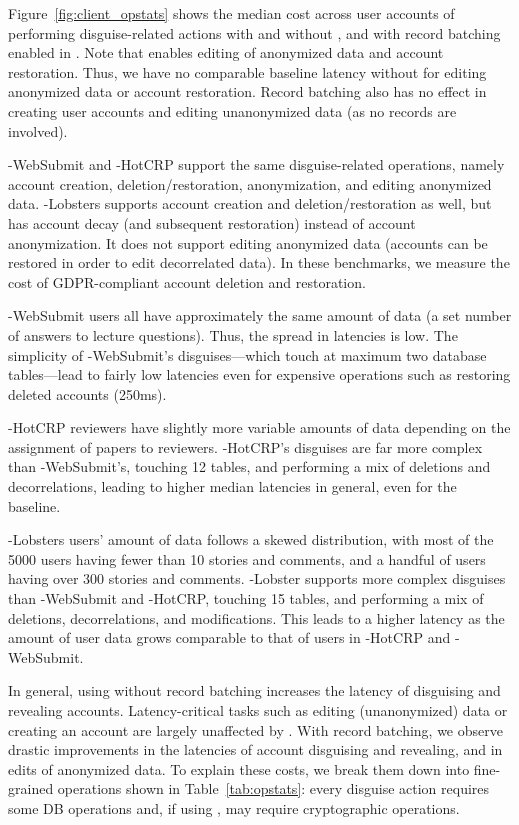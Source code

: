 %
Figure~\ref{fig:client_opstats} shows the median cost across user accounts of performing disguise-related actions with and
without \sys, and with record batching enabled in \sys.
Note that \sys enables editing of anonymized data and account restoration. Thus, we have no
comparable baseline latency without \sys for editing anonymized data or account restoration.
Record batching also has no effect in creating user accounts and editing unanonymized data (as no
records are involved).

\sys-WebSubmit and \sys-HotCRP support the same disguise-related operations, namely
account creation, deletion/restoration, anonymization, and editing anonymized data.
\sys-Lobsters supports account creation and deletion/restoration as well, but has account decay (and
subsequent restoration) instead of account anonymization.  It does not support editing anonymized
data (accounts can be restored in order to edit decorrelated data). In these benchmarks, we measure
the cost of GDPR-compliant account deletion and restoration.

\sys-WebSubmit users all have approximately the same amount of data (a set number of answers to
lecture questions). Thus, the spread in latencies is low. The simplicity of \sys-WebSubmit's
disguises---which touch at maximum two database tables---lead to fairly low latencies even for
expensive operations such as restoring deleted accounts (250ms).

\sys-HotCRP reviewers have slightly more variable amounts of data  depending on the
assignment of papers to reviewers. \sys-HotCRP's disguises are far more complex than
\sys-WebSubmit's, touching 12 tables, and performing a mix of deletions and
decorrelations, leading to higher median latencies in general, even for the baseline.

\sys-Lobsters users' amount of data follows a skewed distribution, with most of the 5000 users
having fewer than 10 stories and comments, and a handful of users having over 300 stories and
comments. \sys-Lobster supports more complex disguises than \sys-WebSubmit and \sys-HotCRP,
touching 15 tables, and performing a mix of deletions, decorrelations, and modifications. This leads
to a higher latency as the amount of user data grows comparable to that of users in \sys-HotCRP and
\sys-WebSubmit.

In general, using \sys without record batching increases the latency of
disguising and revealing accounts. Latency-critical tasks such as editing (unanonymized) data or
creating an account are largely unaffected by \sys. With record batching, we observe drastic
improvements in the latencies of account disguising and revealing, and in edits of anonymized data.
%
To explain these costs, we break them down into fine-grained operations shown in
Table~\ref{tab:opstats}: every disguise action requires some DB operations and,
if using \sys, may require cryptographic operations.

